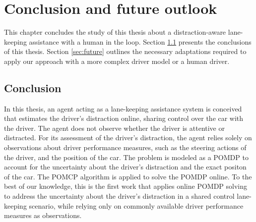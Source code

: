 \chapter{Conclusion and future outlook}
\label{ch:conclusion}

This chapter concludes the study of this thesis about a distraction-aware lane-keeping assistance with a human in the loop. Section \ref{sec:conclusion} presents the conclusions of this thesis. Section \ref{sec:future} outlines the necessary adaptations required to apply our approach with a more complex driver model or a human driver.

\section{Conclusion}
\label{sec:conclusion}



In this thesis, an agent acting as a lane-keeping assistance system is conceived that estimates the driver's distraction online, sharing control over the car with the driver. The agent does not observe whether the driver is attentive or distracted. For its assessment of the driver's distraction, the agent relies solely on observations about driver performance measures, such as the steering actions of the driver, and the position of the car. The problem is modeled as a POMDP to account for the uncertainty about the driver's distraction and the exact positon of the car. The POMCP algorithm is applied to solve the POMDP online. To the best of our knowledge, this is the first work that applies online POMDP solving to address the uncertainty about the driver's distraction in a shared control lane-keeping scenario, while relying only on commonly available driver performance measures as observations.

